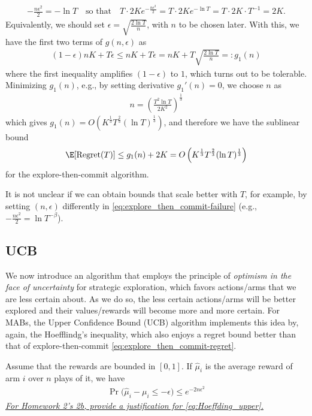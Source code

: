 \begin{align}
\label{eq:explore_then_commit-failure}
    -\tfrac{n \epsilon^2}{2} = -\ln T 
    \quad\text{so that}\quad T\cdot2K e^{-\frac{n \epsilon^2}{2}} = T\cdot2K e^{-\ln T} = T\cdot2K\cdot T^{-1} = 2K.
\end{align}
Equivalently, we should set $\epsilon=\sqrt{\tfrac{2\ln T}{n}}$, with $n$ to be chosen later.
With this, we have the first two terms of $g(n,\epsilon)$ as 
\begin{align*}
    (1-\epsilon)nK + T\epsilon \leq nK + T\epsilon = nK + T\sqrt{\tfrac{2\ln T}{n}} =: g_1(n)
\end{align*}
where the first inequality amplifies $(1-\epsilon)$ to $1$, which turns out to be tolerable.
Minimizing $g_1(n)$, e.g., by setting derivative $g_1'(n)=0$, we choose $n$ as 
\begin{align}
\label{eq:explore_then_commit-n}
    n=\left(\frac{T^2\ln T}{2K^2}\right)^{\frac{1}{3}}
\end{align}
which gives $g_1(n) = O\left(K^{\frac{1}{3}}T^{\frac{2}{3}}(\ln T)^{\frac{1}{3}}\right)$, and therefore we have the sublinear bound
\begin{align}
\label{eq:explore_then_commit-regret}
\E[\Regret(T)] \leq  g_1(n) + 2K = O\left(K^{\frac{1}{3}}T^{\frac{2}{3}}(\ln T)^{\frac{1}{3}}\right)
\end{align}
for the explore-then-commit algorithm.

It is not unclear if we can obtain bounds that scale better with $T$, for example, by setting  $(n,\epsilon)$ differently in \eqref{eq:explore_then_commit-failure} (e.g., $-\tfrac{n \epsilon^2}{2}=\ln{T^{-\beta}}$). 

\subsection{UCB}
We now introduce an algorithm that employs the principle of {\em optimism in the face of uncertainty} for strategic exploration, which favors actions/arms that we are less certain about.
As we do so, the less certain actions/arms will be better explored and their values/rewards will become more and more certain.
For MABs, the Upper Confidence Bound (UCB) algorithm implements this idea by, again, the Hoefflindg's inequality, which also enjoys a regret bound better than that of explore-then-commit \eqref{eq:explore_then_commit-regret}.

Assume that the rewards are bounded in $[0,1]$.
If $\hat{\mu}_{i}$ is the average reward of arm $i$ over $n$ plays of it, we have
\begin{align}
\label{eq:Hoeffding_upper}
    \Pr\big(\hat{\mu}_i-\mu_i \leq -\epsilon\big) \leq e^{-2 n \epsilon^2}
\end{align}
\underline{\em For Homework 2's 2b, provide a justification for \eqref{eq:Hoeffding_upper}.}


